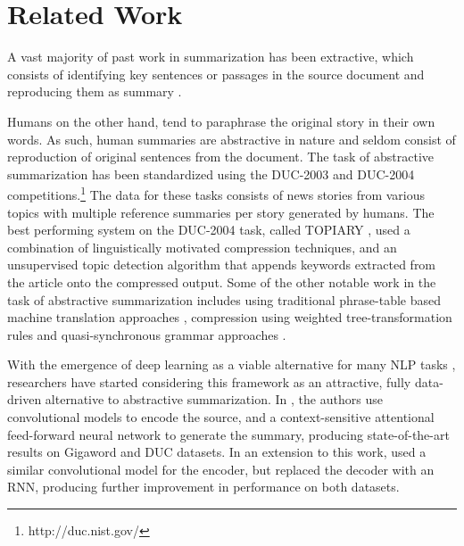 \section{Related Work}\label{sec:related_work}

A vast majority of past work in summarization has been extractive, which consists of identifying key sentences or passages in the source document and reproducing them as summary \cite{neto:2002:ATS,extractive,wong:2008:ESU,filippovaA13:EMNLP,colmenares:NAACL2015,graph_based,key_phrases,key_passages}.

Humans on the other hand, tend to paraphrase the original story in their own words. As such, human summaries are abstractive in nature and seldom consist of reproduction of original sentences from the document. The task of abstractive summarization has been standardized using the DUC-2003 and DUC-2004 competitions.\footnote{http://duc.nist.gov/} The data for these tasks consists of news stories from various topics with multiple reference summaries per story generated by humans. 
The best performing system on the DUC-2004 task, called TOPIARY \cite{topiary}, used a combination of linguistically motivated compression techniques, and an unsupervised topic detection algorithm that appends keywords extracted from the article onto the compressed output. Some of the other notable work in the task of abstractive summarization includes using traditional phrase-table based machine translation approaches \cite{mt4summ}, compression using weighted tree-transformation rules \cite{cohn_lapata} and quasi-synchronous grammar approaches \cite{woodsend}.


With the emergence of deep learning as a viable alternative for many NLP tasks \cite{nlp_from_scratch}, researchers have started considering this framework as an  attractive, fully data-driven alternative to abstractive summarization. 
In , the authors use convolutional models to encode the source, and a context-sensitive attentional feed-forward neural network to generate the summary, producing state-of-the-art results on Gigaword and DUC datasets. In an extension to this work,  used a similar convolutional model for the encoder, but replaced the decoder with an RNN, producing further improvement in performance on both datasets.

